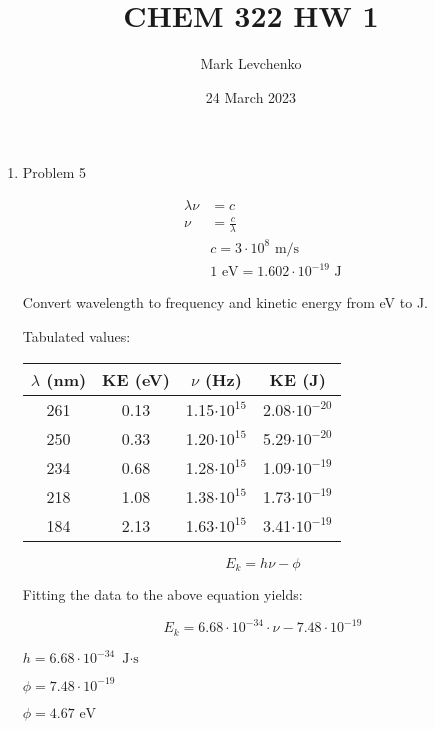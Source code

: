 \documentclass[12pt]{article}
\title{CHEM 322 HW 1}
\author[1]{Mark Levchenko}
\affil[1]{Group 11}
\date{24 March 2023}
\begin{document}
\begin{enumerate}

    \item Problem 5
    
    \begin{align*}
        \lambda \nu &= c \\
        \nu &= \frac{c}{\lambda} \\
        & c = 3 \cdot 10^{8} \text{ m/s} \\
        & 1 \text{ eV} = 1.602 \cdot 10^{-19} \text{ J}
    \end{align*}

    Convert wavelength to frequency and kinetic energy from eV to J.

    Tabulated values:

    \begin{tabular}{|c|c|c|c|}
        \hline
        $\lambda$ (nm) & KE (eV) & $\nu$ (Hz) & KE (J) \\
        \hline
        261 & 0.13 & 1.15$\cdot 10^{15}$ & 2.08$\cdot 10^{-20}$ \\
        250 & 0.33 & 1.20$\cdot 10^{15}$ & 5.29$\cdot 10^{-20}$ \\ 
        234 & 0.68 & 1.28$\cdot 10^{15}$ & 1.09$\cdot 10^{-19}$ \\
        218	& 1.08 & 1.38$\cdot 10^{15}$ & 1.73$\cdot 10^{-19}$ \\ 
        184	& 2.13 & 1.63$\cdot 10^{15}$ & 3.41$\cdot 10^{-19}$ \\
        \hline
    \end{tabular}

    \[ E_k = h \nu - \phi \]

    Fitting the data to the above equation yields:

    \[ E_k = 6.68 \cdot 10^{-34} \cdot \nu - 7.48 \cdot 10^{-19} \]

    $\boxed{h = 6.68 \cdot 10^{-34} \text{ J$\cdot$s}}$

    $\phi = 7.48 \cdot 10^{-19}$
    
    $\boxed{\phi = 4.67 \text{ eV}}$

\end{enumerate}
\end{document}

